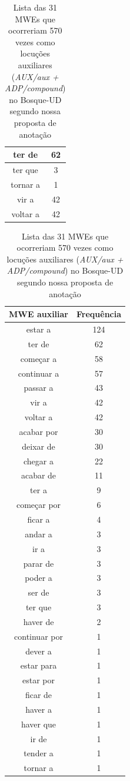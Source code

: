 \documentclass[output=paper,colorlinks,citecolor=brown]{langscibook}
\begin{document}
\begin{table}[]
{\begin{tabular}{|c|c|}
				ter de & 62\\\hline
				ter que & 3\\\hline
				tornar a & 1\\\hline
				vir a & 42\\\hline
				voltar a & 42\\\hline
			\end{tabular}
		}
		\hfill
		\parbox{.45\linewidth}{
			\centering
			\begin{tabular}{|c|c|}
				\hline
				\textbf{MWE auxiliar} & \textbf{Frequência} \\\hline
				estar a & 124\\\hline
				ter de & 62\\\hline
				começar a & 58\\\hline
				continuar a & 57\\\hline
				passar a & 43\\\hline
				vir a & 42\\\hline
				voltar a & 42\\\hline
				acabar por & 30\\\hline
				deixar de & 30\\\hline
				chegar a & 22\\\hline
				acabar de & 11\\\hline
				ter a & 9\\\hline
				começar por & 6\\\hline
				ficar a & 4\\\hline
				andar a & 3\\\hline
				ir a & 3\\\hline
				parar de & 3\\\hline
				poder a & 3\\\hline
				ser de & 3\\\hline
				ter que & 3\\\hline
				haver de & 2\\\hline
				continuar por & 1\\\hline
				dever a & 1\\\hline
				estar para & 1\\\hline
				estar por & 1\\\hline
				ficar de & 1\\\hline
				haver a & 1\\\hline
				haver que & 1\\\hline
				ir de & 1\\\hline
				tender a & 1\\\hline
				tornar a & 1\\\hline
			\end{tabular}
		}
		\caption{Lista das 31 MWEs que ocorreriam 570 vezes como locuções auxiliares (\emph{AUX/aux + ADP/compound}) no Bosque-UD segundo nossa proposta de anotação}
		\label{tab:auxphrasalverb}
	\end{table}
\end{document}
